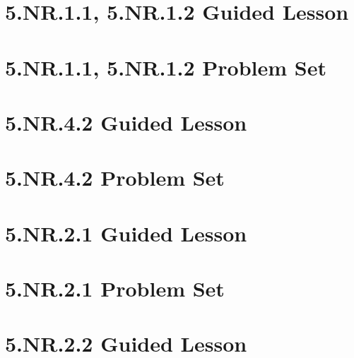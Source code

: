\documentclass[a4paper,12pt]{article}
\title{}
\date{}
\begin{document}

\tableofcontents
\newpage

\newpage
\section{5.NR.1.1, 5.NR.1.2 Guided Lesson}


\newpage
\section{5.NR.1.1, 5.NR.1.2 Problem Set}


\newpage
\section{5.NR.4.2 Guided Lesson}


\newpage
\section{5.NR.4.2 Problem Set}


\newpage
\section{5.NR.2.1 Guided Lesson}


\newpage
\section{5.NR.2.1 Problem Set}


\newpage
\section{5.NR.2.2 Guided Lesson}

\end{document}
